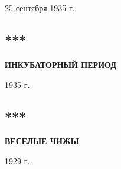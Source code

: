 \documentclass{article}
\begin{document}
\author{\textbf{\Large ДАНИИЛ ХАРМС}}
\date{}

\maketitle

\section*{}
\indent
\begin{flushright}
    25 сентября 1935 г.
\end{flushright}
\begin{center}
    \section*{***}
    \textbf{ИНКУБАТОРНЫЙ ПЕРИОД}
\end{center}
\indent
\begin{flushright}
    1935 г.
\end{flushright}
\begin{center}
    \section*{***}
    \textbf{ВЕСЕЛЫЕ ЧИЖЫ}
\end{center}
\vspace{\baselineskip}


\begin{flushright}
    1929 г.
\end{flushright}
\end{document}
